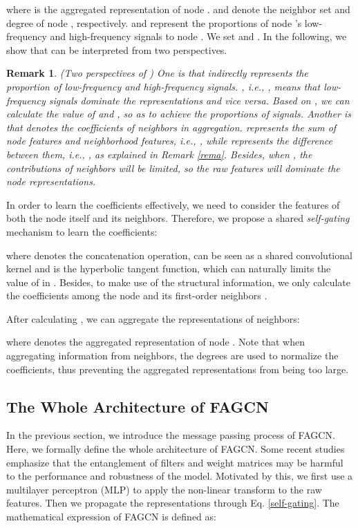 \documentclass[letterpaper]{article} \usepackage{aaai21}  \usepackage{times}  \usepackage{helvet} \usepackage{courier}  \usepackage[hyphens]{url}  \usepackage{graphicx} \urlstyle{rm} \def\UrlFont{\rm}  \usepackage{natbib}  \usepackage{caption} \frenchspacing  \setlength{\pdfpagewidth}{8.5in}  \setlength{\pdfpageheight}{11in}
\newtheorem{remark}{Remark}
\begin{document}
where  is the aggregated representation of node .  and  denote the neighbor set and degree of node , respectively.  and  represent the proportions of node 's low-frequency and high-frequency signals to node . 
We set  and .
In the following, we show that  can be interpreted from two perspectives.

\begin{remark}
	(Two perspectives of ) One is that  indirectly represents the proportion of low-frequency and high-frequency signals.  , i.e., , means that low-frequency signals dominate the representations and vice versa. 
	Based on , we can calculate the value of  and , so as to achieve the proportions of signals.
	Another is that  denotes the coefficients of neighbors in aggregation.  represents the sum of node features and neighborhood features, i.e., , while  represents the difference between them, i.e., , as explained in Remark \ref{rema}. Besides, when , the contributions of neighbors will be limited, so the raw features will dominate the node representations. 
\end{remark}

In order to learn the coefficients  effectively, we need to consider the features of both the node itself and its neighbors.
Therefore, we propose a shared \emph{self-gating} mechanism  to learn the coefficients:

where  denotes the concatenation operation,  can be seen as a shared convolutional kernel \cite{GAT} and  is the hyperbolic tangent function, which can naturally limits the value of  in . Besides, to make use of the structural information, we only calculate the coefficients among the node and its first-order neighbors .

After calculating , we can aggregate the representations of neighbors:

where  denotes the aggregated representation of node . Note that when aggregating information from neighbors, the degrees are used to normalize the coefficients, thus preventing the aggregated representations from being too large. 
\subsection{The Whole Architecture of FAGCN}
In the previous section, we introduce the message passing process of FAGCN. Here, we formally define the whole architecture of FAGCN. Some recent studies \cite{SGC, cui2020adaptive} emphasize that the entanglement of filters and weight matrices may be harmful to the performance and robustness of the model. Motivated by this, we first use a multilayer perceptron (MLP) to apply the non-linear transform to the raw features. Then we propagate the representations through Eq. \ref{self-gating}. The mathematical expression of FAGCN is defined as:
\end{document}
